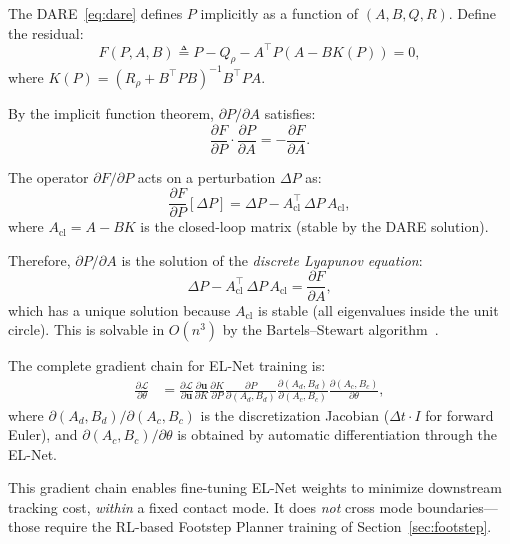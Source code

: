\documentclass[letterpaper, 10pt, conference]{IEEEtran}
\newcommand{\bu}{\bm{u}}
\begin{document}
The DARE~\eqref{eq:dare} defines $P$ implicitly as a function
of $(A, B, Q, R)$.
Define the residual:
\begin{equation}\label{eq:dare_residual}
  F(P, A, B) \triangleq P - Q_\rho
    - A^\top P (A - B K(P)) = 0,
\end{equation}
where $K(P) = (R_\rho + B^\top P B)^{-1} B^\top P A$.

By the implicit function theorem,
$\partial P / \partial A$ satisfies:
\[
  \frac{\partial F}{\partial P} \cdot
  \frac{\partial P}{\partial A}
  = - \frac{\partial F}{\partial A}.
\]

The operator $\partial F / \partial P$ acts on a perturbation
$\Delta P$ as:
\[
  \frac{\partial F}{\partial P}[\Delta P]
  = \Delta P - A_{\mathrm{cl}}^\top \, \Delta P \, A_{\mathrm{cl}},
\]
where $A_{\mathrm{cl}} = A - B K$ is the closed-loop matrix
(stable by the DARE solution).

Therefore, $\partial P / \partial A$ is the solution of the
\emph{discrete Lyapunov equation}:
\begin{equation}\label{eq:lyap_full}
  \Delta P - A_{\mathrm{cl}}^\top \, \Delta P \, A_{\mathrm{cl}}
  = \frac{\partial F}{\partial A},
\end{equation}
which has a unique solution because $A_{\mathrm{cl}}$ is stable
(all eigenvalues inside the unit circle).
This is solvable in $O(n^3)$ by the Bartels--Stewart
algorithm~\cite{bartels1972}.

The complete gradient chain for EL-Net training is:
\begin{align}
  \frac{\partial \mathcal{L}}{\partial \theta}
  &= \frac{\partial \mathcal{L}}{\partial \bu}
     \frac{\partial \bu}{\partial K}
     \frac{\partial K}{\partial P}
     \frac{\partial P}{\partial (A_d, B_d)}
     \frac{\partial (A_d, B_d)}{\partial (A_c, B_c)}
     \frac{\partial (A_c, B_c)}{\partial \theta},
     \label{eq:grad_chain}
\end{align}
where $\partial(A_d, B_d)/\partial(A_c, B_c)$ is the
discretization Jacobian ($\Delta t \cdot I$ for forward Euler),
and $\partial(A_c, B_c)/\partial\theta$ is obtained by
automatic differentiation through the EL-Net.

This gradient chain enables fine-tuning EL-Net weights
to minimize downstream tracking cost, \emph{within} a fixed
contact mode.
It does \emph{not} cross mode boundaries---those require
the RL-based Footstep Planner training of
Section~\ref{sec:footstep}.
\end{document}
